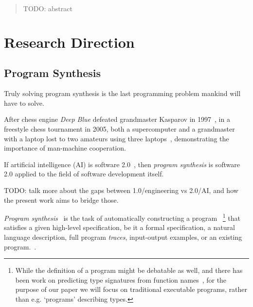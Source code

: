 \documentclass{article}
\begin{document}


\tableofcontents

\pagebreak

\begin{abstract}
    TODO: abstract
\end{abstract}

\section{Research Direction} %

\subsection{Program Synthesis}

\epigraph{
    Truly solving program synthesis is the last programming problem mankind will have to solve.
}{
    \textit{\citet{nps}}
}

After chess engine \emph{Deep Blue} defeated grandmaster Kasparov in 1997~\citep{deepblue},
in a freestyle chess tournament in 2005,
both a supercomputer and a grandmaster with a laptop lost to two amateurs using three laptops~\citep{kasparov},
demonstrating the importance of man-machine cooperation.

\begin{displayquote}
    If artificial intelligence (AI) is software 2.0~\citep{software20},
    then \emph{program synthesis} is software 2.0 applied to the field of software development itself.
\end{displayquote}

TODO: talk more about the gaps between 1.0/engineering vs 2.0/AI, and how the present work aims to bridge those.

\emph{Program synthesis}~\citep{church1957applications} is the task of automatically constructing a program%
~\footnote{
    While the definition of a program might be debatable as well,
    and there has been work on predicting type signatures from function names~\citep{wang2018predicting},
    for the purpose of our paper we will focus on traditional executable programs,
    rather than e.g. `programs' describing types.
}
that satisfies a given high-level specification,
be it a formal specification, a natural language description,
full program \emph{traces}, input-output examples,
or an existing program.~\citep{gulwani2017program}.
\end{document}
